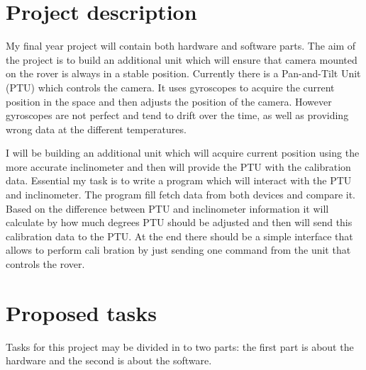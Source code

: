 \documentclass[11pt,fleqn,twoside]{article}
\begin{document}
\wordcount{}

\mmp

\setcounter{tocdepth}{3} %


\section{Project description}
My final year project will contain both hardware and software parts. The aim of the project is to build an additional unit which will ensure that camera mounted on the rover is always in a stable position. Currently there is a Pan-and-Tilt Unit (PTU) which controls the camera. It uses gyroscopes to acquire the current position in the space and then adjusts the position of the camera. However gyroscopes are not perfect and tend to drift over the time, as well as providing wrong data at the different temperatures. 

I will be building an additional unit which will acquire current position using the more accurate inclinometer and then will provide the PTU with the calibration data. Essential my task is to write a program which will interact with the PTU and inclinometer. The program fill fetch data from both devices and compare it. Based on the difference between PTU and inclinometer information it will calculate by how much degrees PTU should be adjusted and then will send this calibration data to the PTU. At the end there should be a simple interface that allows to perform cali bration by just sending one command from the unit that controls the rover.   

\section{Proposed tasks}
Tasks for this project may be divided in to two parts: the first part is about the hardware and the second is about the software. 
\end{document}
